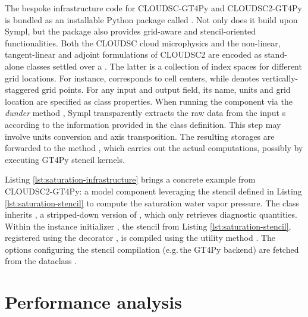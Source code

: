 \documentclass[gmd,manuscript,online]{copernicus}
\theoremstyle{theorem}
\theoremstyle{definition}
\theoremstyle{remark}
\theoremstyle{proposition}
\begin{document}
	The bespoke infrastructure code for CLOUDSC-GT4Py and CLOUDSC2-GT4Py is bundled as an installable Python package called . Not only does it build upon Sympl, but the package also provides grid-aware and stencil-oriented functionalities. Both the CLOUDSC cloud microphysics and the non-linear, tangent-linear and adjoint formulations of CLOUDSC2 are encoded as stand-alone  classes settled over a . The latter is a collection of index spaces for different grid locations. For instance,  corresponds to cell centers, while  denotes vertically-staggered grid points. For any input and output field, its name, units and grid location are specified as class properties. When running the component via the \emph{dunder} method , Sympl transparently extracts the raw data from the input s according to the information provided in the class definition. This step may involve units conversion and axis transposition. The resulting storages are forwarded to the method , which carries out the actual computations, possibly by executing GT4Py stencil kernels.

	Listing \ref{lst:saturation-infrastructure} brings a concrete example from CLOUDSC2-GT4Py: a model component leveraging the stencil defined in Listing \ref{lst:saturation-stencil} to compute the saturation water vapor pressure. The class inherits , a stripped-down version of , which only retrieves diagnostic quantities. Within the instance initializer , the stencil from Listing \ref{lst:saturation-stencil}, registered using the decorator , is compiled using the utility method . The options configuring the stencil compilation (e.g.\,the GT4Py backend) are fetched from the dataclass .

	\section{Performance analysis}
	\label{section:performance-analysis}
\end{document}
